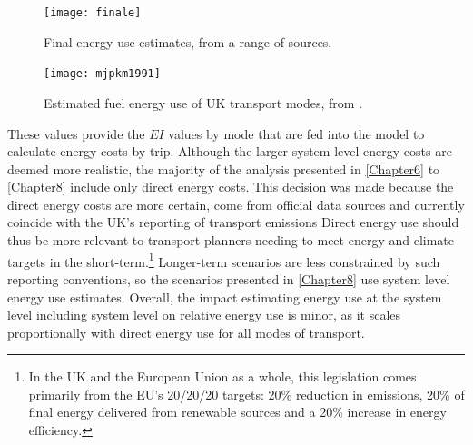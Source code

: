 \begin{figure}[h]
 \centering
 \texttt{[image: finale]}
 \caption{Final energy use estimates, from a range of sources.}
 \label{ffinale}
\end{figure}

\begin{figure}[h]
 \centering
 \texttt{[image: mjpkm1991]}
 \caption[Fuel energy use of UK transport modes, 1991]
 {Estimated fuel energy use of UK transport modes, from \citet{Hughes1991149}.}
 \label{fmjpkm1991}
\end{figure}

These values provide the $EI$ values by mode that are fed into the model
to calculate energy costs by trip. Although the larger system level energy costs
are deemed more realistic, the majority of the analysis presented in \cref{Chapter6}
to \cref{Chapter8} include only direct energy costs. This decision was made
because the direct energy costs are more certain, come from official data sources and
currently coincide with the UK's reporting of transport emissions
Direct energy use should thus be more relevant to transport planners needing to meet energy and climate
targets in the short-term.\footnote{In
the UK and the European Union as a whole, this legislation
comes primarily from the EU's 20/20/20 targets: 20\% reduction
in emissions, 20\% of final energy delivered from renewable sources and
a 20\% increase in energy efficiency.
}
Longer-term scenarios 
are less constrained by such reporting conventions, so the scenarios
presented in \cref{Chapter8} use system level energy use estimates.
Overall, the impact estimating energy use at the system level
including system level on relative energy use is minor, as it scales
proportionally with direct energy use for all modes of transport.


